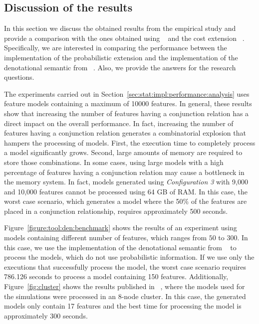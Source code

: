 
\subsection{Discussion of the results}
\label{sec:stat:impl:comp}

In this section we discuss the obtained results from the empirical study and
provide a comparison with the ones obtained using \fodaPA~\cite{acl13}
and the cost extension \fodaPAc~\cite{clc16}. Specifically, we are interested in
comparing the performance between the implementation of the probabilistic
extension and the implementation of the denotational semantic from
\fodaPA~\cite{acl13}. Also, we provide the answers for the research questions.

The experiments carried out in Section~\ref{sec:stat:impl:performance:analysis}
uses feature models containing a maximum of 10000 features. In general,
these results show that increasing the number of features having a conjunction relation
has a direct impact on the overall performance. In fact, increasing the number of features having
a conjunction relation generates a combinatorial explosion that hampers the processing of models.
First, the execution time to completely process a model significantly grows. Second, large amounts
of memory are required to store those combinations. In some cases, using large models with a high
percentage of features having a conjunction relation may cause a bottleneck in the memory system.
In fact, models generated using \textit{Configuration 3} with 9,000 and 10,000 features cannot be
processed using 64 GB of RAM. In this case,
the worst case scenario, which generates a model where the 50\% of the features are
placed in a conjunction relationship, requires approximately 500 seconds.

Figure~\ref{figure:tool:den:benchmark} shows the results of an experiment using
models containing different number of features, which ranges from $50$ to $300$.
In this case, we use the implementation of the denotational semantic from
\fodaPA~\cite{acl13} to process the models, which do not use probabilistic
information. If we use only the executions that successfully process the model,
the worst case scenario requires 786.126 seconds to process a model containing 150
features. Additionally, Figure~\ref{fig:cluster} shows the results published in 
\fodaPAc~\cite{clc16}, where the models used for the simulations were processed in
an 8-node cluster. In this case, the generated models only contain 17 features and
the best time for processing the model is approximately 300 seconds.

